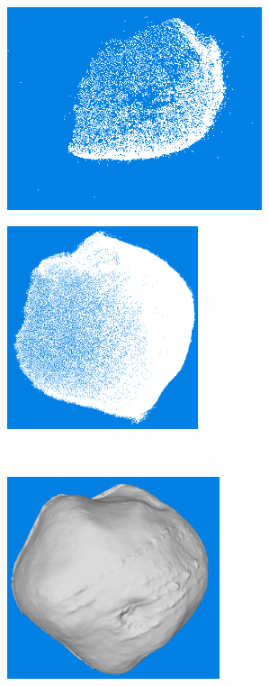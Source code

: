 \begin{figure}[htbp]
    \centering
    \begin{subfigure}[b]{0.4\textwidth}
        \centering
        \includegraphics[width=\textwidth,height=5.95cm]{doc/thesis/0_figures/models_quality/100_1/120_100_1_points2.png}
        \caption{}
        \label{fig:recon_step_point}
    \end{subfigure}
    \begin{subfigure}[b]{0.4\textwidth}
        \centering
        \includegraphics[width=\textwidth,height=5.95cm]{doc/thesis/0_figures/models_quality/100_1/120_100_1_dense1.png}
        \caption{}
        \label{fig:recon_step_dense}
    \end{subfigure}
    \\
    \begin{subfigure}[b]{0.4\textwidth}
        \centering
        \includegraphics[width=\textwidth,height=5.95cm]{doc/thesis/0_figures/models_quality/100_1/120_100_1_mesh1.png}

\end{subfigure}
\end{figure}
